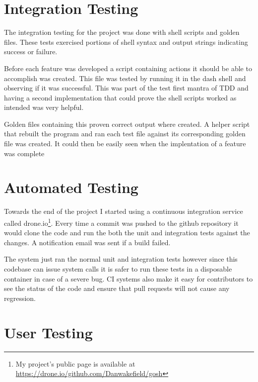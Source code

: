 \section{Integration Testing}
The integration testing for the project was done with shell scripts and golden files.
These tests exercised portions of shell syntax and output strings indicating success or failure.

Before each feature was developed a script containing actions it should be able to accomplish was created.
This file was tested by running it in the dash shell and observing if it was successful.
This was part of the test first mantra of TDD and having a second implementation that could prove the shell scripts worked as intended was very helpful.

Golden files containing this proven correct output where created.
A helper script that rebuilt the program and ran each test file against its corresponding golden file was created.
It could then be easily seen when the implentation of a feature was complete





\section{Automated Testing}
Towards the end of the project I started using a continuous integration service called drone.io\footnote{My project's public page is available at \url{https://drone.io/github.com/Danwakefield/gosh}}.
Every time a commit was pushed to the github repository it would clone the code and run the both the unit and integration tests against the changes.
A notification email was sent if a build failed.

The system just ran the normal unit and integration tests however since this codebase can issue system calls it is safer to run these tests in a disposable container in case of a severe bug.  
CI systems also make it easy for contributors to see the status of the code and ensure that pull requests will not cause any regression.

\section{User Testing}















